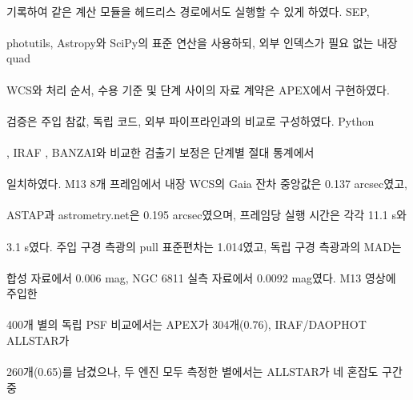 \paragraph*{}기록하여 같은 계산 모듈을 헤드리스 경로에서도 실행할 수 있게 하였다. SEP,
\paragraph*{}photutils, Astropy와 SciPy의 표준 연산을 사용하되, 외부 인덱스가 필요 없는 내장 quad
\paragraph*{}WCS와 처리 순서, 수용 기준 및 단계 사이의 자료 계약은 APEX에서 구현하였다.
\paragraph*{}검증은 주입 참값, 독립 코드, 외부 파이프라인과의 비교로 구성하였다. Python
\paragraph*{}\texttt{}, IRAF \texttt{}, BANZAI와 비교한 검출기 보정은 단계별 절대 통계에서
\paragraph*{}일치하였다. M13 8개 프레임에서 내장 WCS의 Gaia 잔차 중앙값은 0.137 arcsec였고,
\paragraph*{}ASTAP과 astrometry.net은 0.195 arcsec였으며, 프레임당 실행 시간은 각각 11.1 s와
\paragraph*{}3.1 s였다. 주입 구경 측광의 pull 표준편차는 1.014였고, 독립 구경 측광과의 MAD는
\paragraph*{}합성 자료에서 0.006 mag, NGC 6811 실측 자료에서 0.0092 mag였다. M13 영상에 주입한
\paragraph*{}400개 별의 독립 PSF 비교에서는 APEX가 304개(0.76), IRAF/DAOPHOT ALLSTAR가
\paragraph*{}260개(0.65)를 남겼으나, 두 엔진 모두 측정한 별에서는 ALLSTAR가 네 혼잡도 구간 중
